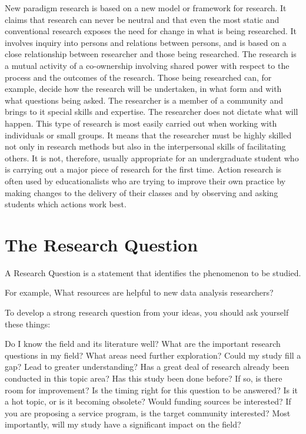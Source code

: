 \documentclass[12pt, a4paper]{report}
\begin{document}
New paradigm research is based on a new model or framework for research. It claims that research can never be neutral and that even the most static and conventional research exposes the need for change in what is being researched. It involves inquiry into persons and relations between persons, and is based on a close relationship between researcher and those being researched. The research is a mutual activity of a co-ownership involving shared power with respect to the process and the outcomes of the research. Those being researched can, for example, decide how the research will be undertaken, in what form and with what questions being asked. The researcher is a member of a community and brings to it special skills and expertise. The researcher does not dictate what will happen. This type of research is most easily carried out when working with individuals or small groups. It means that the researcher must be highly skilled not only in research methods but also in the interpersonal skills of facilitating others. It is not, therefore, usually appropriate for an undergraduate student who is carrying out a major piece of research for the first time. Action research is often used by educationalists who are trying to improve their own practice by making changes to the delivery of their classes and by observing and asking students which actions work best.




\section{The Research Question}


A Research Question is a statement that identifies the phenomenon to be studied.

For example, What resources are helpful to new data analysis researchers?

To develop a strong research question from your ideas, you should ask yourself these things:

Do I know the field and its literature well?
What are the important research questions in my field?
What areas need further exploration?
Could my study fill a gap? Lead to greater understanding?
Has a great deal of research already been conducted in this topic area?
Has this study been done before? If so, is there room for improvement?
Is the timing right for this question to be answered? Is it a hot topic, or is it becoming obsolete?
Would funding sources be interested?
If you are proposing a service program, is the target community interested?
Most importantly, will my study have a significant impact on the field?
\end{document}
